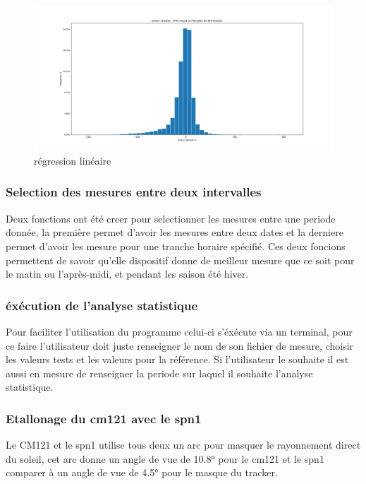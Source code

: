 \documentclass[12pt,a4paper]{article}
\begin{document}
\begin{flushleft}
\begin{figure}[H]
\centering
\includegraphics[width=15cm]{image/histogramme/2.png}  
\caption{régression linéaire}  
\end{figure}

\subsubsection{Selection des mesures entre deux intervalles}

Deux fonctions ont été creer pour selectionner les mesures entre une periode donnée, la première permet d'avoir les mesures entre deux dates et la derniere permet d'avoir les mesure pour une tranche horaire spécifié. Ces deux foncions permettent de savoir qu'elle dispositif donne de meilleur mesure que ce soit pour le matin ou l'après-midi, et pendant les saison été hiver.

\subsubsection{éxécution de l'analyse statistique}

Pour faciliter l'utilisation du programme celui-ci s'éxécute via un terminal, pour ce faire l'utilisateur doit juste renseigner le nom de son fichier de mesure, choisir les valeurs tests et les valeurs pour la référence. Si l'utilisateur le souhaite il est aussi en mesure de renseigner la periode sur laquel il souhaite l'analyse statistique.

\subsubsection{Etallonage du cm121 avec le spn1}

Le CM121 et le spn1 utilise tous deux un arc pour masquer le rayonnement direct du soleil, cet arc donne un angle de vue de 10.8° pour le cm121 et le spn1 comparer à un angle de vue de 4.5° pour le masque du tracker.


\end{flushleft}
\end{document}
